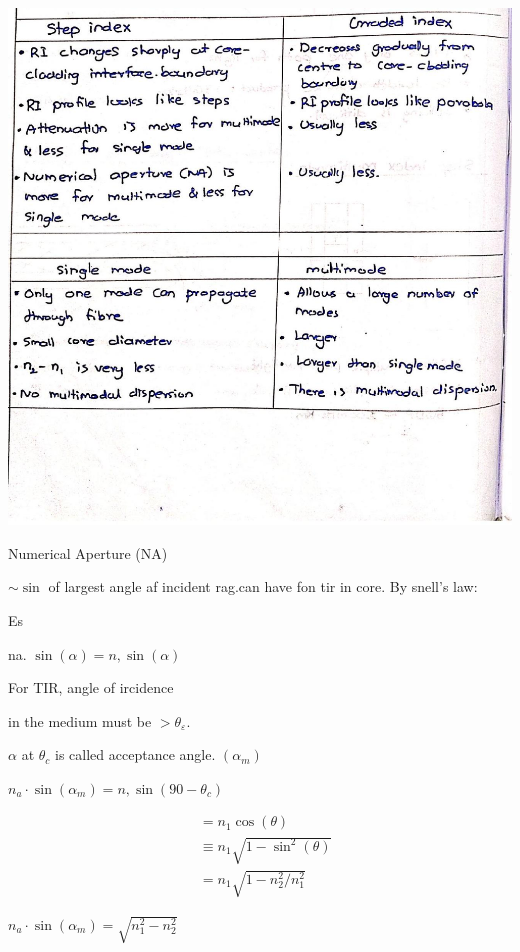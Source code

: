 \documentclass[10pt]{article}
\begin{document}
\begin{center}
\includegraphics[max width=\textwidth]{2024_06_16_30d750483617f1939202g-06(4)}
\end{center}

Numerical Aperture (NA)

$\sim \sin$ of largest angle af incident rag.can have fon tir in core. By snell's law:

Es

na. $\sin (\alpha)=n, \sin (\alpha)$

For TIR, angle of ircidence

in the medium must be $>\theta_{\varepsilon}$.

$\alpha$ at $\theta_{c}$ is called acceptance angle. $\left(\alpha_{m}\right)$

$n_{a} \cdot \sin \left(\alpha_{m}\right)=n, \sin \left(90-\theta_{c}\right)$

$$
\begin{aligned}
& =n_{1} \cos (\theta) \\
& \equiv n_{1} \sqrt{1-\sin ^{2}(\theta)} \\
& =n_{1} \sqrt{1-n_{2}^{2} / n_{1}^{2}}
\end{aligned}
$$

$n_{a} \cdot \sin \left(\alpha_{m}\right)=\sqrt{n_{1}^{2}-n_{2}^{2}}$
\end{document}
